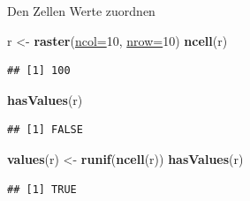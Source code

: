 \documentclass[ignorenonframetext,]{beamer}
\newenvironment{Shaded}{\begin{snugshade}}{\end{snugshade}}
\newcommand{\DataTypeTok}[1]{\textcolor[rgb]{0.74,0.68,0.62}{\underline{#1}}}
\newcommand{\DecValTok}[1]{\textcolor[rgb]{0.27,0.67,0.26}{#1}}
\newcommand{\KeywordTok}[1]{\textcolor[rgb]{0.26,0.66,0.93}{\textbf{#1}}}
\newcommand{\NormalTok}[1]{\textcolor[rgb]{0.74,0.68,0.62}{#1}}
\newcommand{\StringTok}[1]{\textcolor[rgb]{0.02,0.61,0.04}{#1}}
\begin{document}
\begin{frame}[fragile]{Den Zellen Werte zuordnen}
\protect\hypertarget{den-zellen-werte-zuordnen}{}

\begin{Shaded}
\begin{Highlighting}[]
\NormalTok{r <-}\StringTok{ }\KeywordTok{raster}\NormalTok{(}\DataTypeTok{ncol=}\DecValTok{10}\NormalTok{, }\DataTypeTok{nrow=}\DecValTok{10}\NormalTok{)}
\KeywordTok{ncell}\NormalTok{(r)}
\end{Highlighting}
\end{Shaded}

\begin{verbatim}
## [1] 100
\end{verbatim}

\begin{Shaded}
\begin{Highlighting}[]
\KeywordTok{hasValues}\NormalTok{(r)}
\end{Highlighting}
\end{Shaded}

\begin{verbatim}
## [1] FALSE
\end{verbatim}

\begin{Shaded}
\begin{Highlighting}[]
\KeywordTok{values}\NormalTok{(r) <-}\StringTok{ }\KeywordTok{runif}\NormalTok{(}\KeywordTok{ncell}\NormalTok{(r))}
\KeywordTok{hasValues}\NormalTok{(r)}
\end{Highlighting}
\end{Shaded}

\begin{verbatim}
## [1] TRUE
\end{verbatim}

\end{frame}
\end{document}
